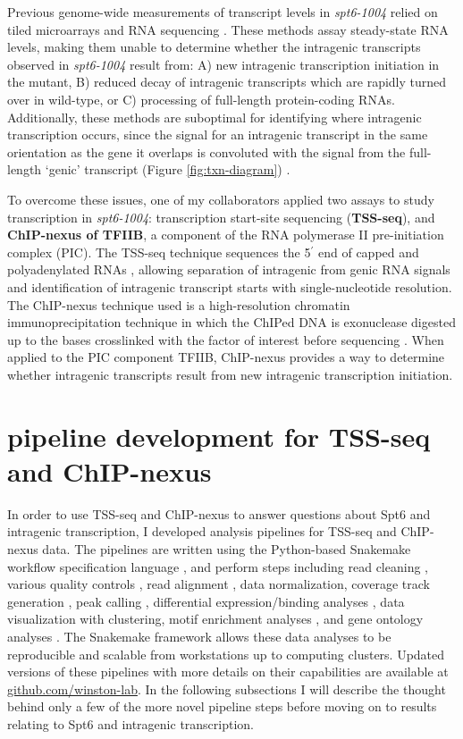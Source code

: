 Previous genome-wide measurements of transcript levels in \textit{spt6-1004} relied on tiled microarrays \citep{cheung2008} and RNA sequencing \citep{uwimana2017}.
These methods assay steady-state RNA levels, making them unable to determine whether the intragenic transcripts observed in \textit{spt6-1004} result from: A) new intragenic transcription initiation in the mutant, B) reduced decay of intragenic transcripts which are rapidly turned over in wild-type, or C) processing of full-length protein-coding RNAs.
Additionally, these methods are suboptimal for identifying where intragenic transcription occurs, since the signal for an intragenic transcript in the same orientation as the gene it overlaps is convoluted with the signal from the full-length `genic' transcript (Figure \ref{fig:txn-diagram}) \citep{cheung2008, lickwar2009}.

To overcome these issues, one of my collaborators applied two assays to study transcription in \textit{spt6-1004}: transcription start-site sequencing (\textbf{TSS-seq}), and \textbf{ChIP-nexus of TFIIB}, a component of the RNA polymerase II pre-initiation complex (PIC).
The TSS-seq technique sequences the 5$^\prime$ end of capped and polyadenylated RNAs \citep{arribere2013, malabat2015}, allowing separation of intragenic from genic RNA signals and identification of intragenic transcript starts with single-nucleotide resolution.
The ChIP-nexus technique used is a high-resolution chromatin immunoprecipitation technique in which the ChIPed DNA is exonuclease digested up to the bases crosslinked with the factor of interest before sequencing \citep{he2015}.
When applied to the PIC component TFIIB, ChIP-nexus provides a way to determine whether intragenic transcripts result from new intragenic transcription initiation.

\section{pipeline development for TSS-seq and ChIP-nexus}

In order to use TSS-seq and ChIP-nexus to answer questions about Spt6 and intragenic transcription, I developed analysis pipelines for TSS-seq and ChIP-nexus data.
The pipelines are written using the Python-based Snakemake workflow specification language \citep{koster2012}, and perform steps including read cleaning \citep{martin2011}, various quality controls \citep{andrews2012}, read alignment \citep{kim2013, langmead2012}, data normalization, coverage track generation \citep{quinlan2010}, peak calling \citep{zhang2008}, differential expression/binding analyses \citep{love2014}, data visualization with clustering, motif enrichment analyses \citep{bailey2015}, and gene ontology analyses \citep{young2010}.
The Snakemake framework allows these data analyses to be reproducible and scalable from workstations up to computing clusters.
Updated versions of these pipelines with more details on their capabilities are available at \href{https://github.com/winston-lab}{github.com/winston-lab}.
In the following subsections I will describe the thought behind only a few of the more novel pipeline steps before moving on to results relating to Spt6 and intragenic transcription.

